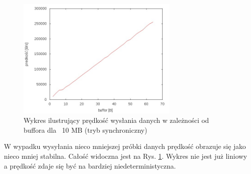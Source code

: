 \documentclass{BscUS}
\begin{document}
\begin{figure}[H]
{
\centering
\includegraphics[width=0.7\textwidth]{./img/S_10737420Send}
\caption{Wykres ilustrujący prędkość wysłania danych w zależności od buffora dla ~10 MB (tryb synchroniczny)}
\label{fig:S_10737420Send}
}
\end{figure}
\noindent W wypadku wysyłania nieco mniejszej próbki danych prędkość obrazuje się jako nieco mniej stabilna. Całość widoczna jest na Rys. \ref{fig:S_10737420Send}. Wykres nie jest już liniowy a prędkość zdaje się być na bardziej niedeterministyczna.
\end{document}
